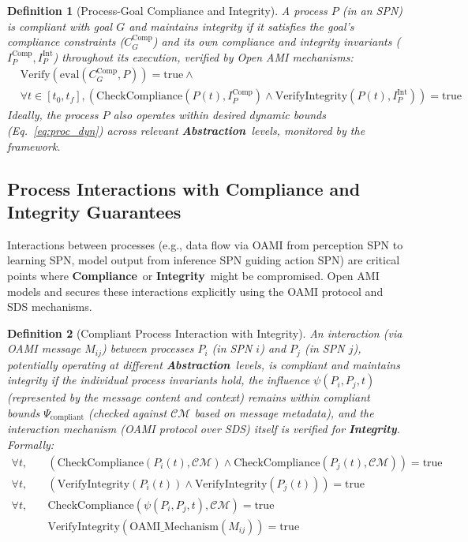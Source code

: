 \documentclass[12pt,a4paper]{report}
\newtheorem{definition}{Definition}[section]
\newcommand{\Compliance}{\textbf{Compliance}}
\newcommand{\Integrity}{\textbf{Integrity}}
\newcommand{\Abstraction}{\textbf{Abstraction}}
\begin{document}
	\begin{definition}[Process-Goal Compliance and Integrity]
		\label{def:proc_goal_comp_int}
		A process $P$ (in an SPN) is compliant with goal $G$ and maintains integrity if it satisfies the goal's compliance constraints ($C_G^{\text{Comp}}$) and its own compliance and integrity invariants ($I_P^{\text{Comp}}, I_P^{\text{Int}}$) throughout its execution, verified by Open AMI mechanisms:
		\begin{align}
			&\text{Verify}(\text{eval}(C_G^{\text{Comp}}, P)) = \text{true} \land \nonumber \\
			&\forall t \in [t_0, t_f], (\text{CheckCompliance}(P(t), I_P^{\text{Comp}}) \land \text{VerifyIntegrity}(P(t), I_P^{\text{Int}})) = \text{true} \label{eq:proc_goal_comp_int_check}
		\end{align}
		Ideally, the process $P$ also operates within desired dynamic bounds (Eq.~\ref{eq:proc_dyn}) across relevant \Abstraction\ levels, monitored by the framework.
	\end{definition}
	
	\subsection{Process Interactions with Compliance and Integrity Guarantees}
	\label{sec:2-2-3}
	
	Interactions between processes (e.g., data flow via OAMI from perception SPN to learning SPN, model output from inference SPN guiding action SPN) are critical points where \Compliance\ or \Integrity\ might be compromised. Open AMI models and secures these interactions explicitly using the OAMI protocol and SDS mechanisms.
	
	\begin{definition}[Compliant Process Interaction with Integrity]
		\label{def:compliant_interaction}
		An interaction (via OAMI message $M_{ij}$) between processes $P_i$ (in SPN $i$) and $P_j$ (in SPN $j$), potentially operating at different \Abstraction\ levels, is compliant and maintains integrity if the individual process invariants hold, the influence $\psi(P_i, P_j, t)$ (represented by the message content and context) remains within compliant bounds $\Psi_{\text{compliant}}$ (checked against $\mathcal{CM}$ based on message metadata), and the interaction mechanism (OAMI protocol over SDS) itself is verified for \Integrity. Formally:
		\begin{align}
			\forall t, &\quad (\text{CheckCompliance}(P_i(t), \mathcal{CM}) \land \text{CheckCompliance}(P_j(t), \mathcal{CM})) = \text{true} \label{eq:interact_indiv_comp} \\
			\forall t, &\quad (\text{VerifyIntegrity}(P_i(t)) \land \text{VerifyIntegrity}(P_j(t))) = \text{true} \label{eq:interact_indiv_int} \\
			\forall t, &\quad \text{CheckCompliance}(\psi(P_i, P_j, t), \mathcal{CM}) = \text{true} \label{eq:interact_influence} \\
			&\quad \text{VerifyIntegrity}(\text{OAMI\_Mechanism}(M_{ij})) = \text{true} \label{eq:interact_mech_int}
		\end{align}
	\end{definition}
	
\end{document}
